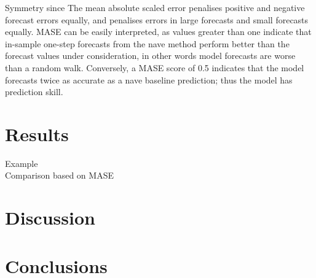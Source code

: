 \documentclass[a4paper]{article}
\begin{document}
Symmetry since The mean absolute scaled error penalises positive and negative forecast errors equally, and penalises errors in large forecasts and small forecasts equally. MASE can be easily interpreted, as values greater than one indicate that in-sample one-step forecasts from the nave method perform better than the forecast values under consideration, in other words model forecasts are worse than a random walk. Conversely, a MASE score of 0.5 indicates that the model forecasts twice as accurate as a nave baseline prediction; thus the model has prediction skill.  

\section{Results}

\begin{description}
\item[Example]
\item[Comparison based on MASE]
\end{description}

\section{Discussion}

\section{Conclusions}



\end{document}
